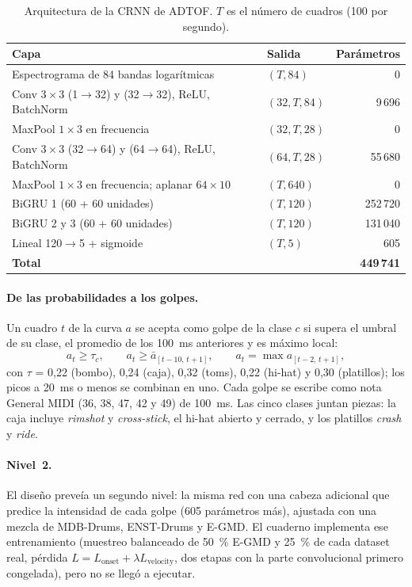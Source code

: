 \documentclass[11pt,a4paper]{article}
\begin{document}
\begin{table}[ht]
\centering
\caption{Arquitectura de la CRNN de ADTOF. $T$ es el número de cuadros (100 por segundo).}
\label{tab:arq}
\begin{tabular}{llr}
\toprule
\textbf{Capa} & \textbf{Salida} & \textbf{Parámetros} \\
\midrule
Espectrograma de 84 bandas logarítmicas & $(T, 84)$ & 0 \\
Conv $3{\times}3$ (1$\to$32) y (32$\to$32), ReLU, BatchNorm & $(32, T, 84)$ & 9\,696 \\
MaxPool $1{\times}3$ en frecuencia & $(32, T, 28)$ & 0 \\
Conv $3{\times}3$ (32$\to$64) y (64$\to$64), ReLU, BatchNorm & $(64, T, 28)$ & 55\,680 \\
MaxPool $1{\times}3$ en frecuencia; aplanar $64\times10$ & $(T, 640)$ & 0 \\
BiGRU 1 (60 + 60 unidades) & $(T, 120)$ & 252\,720 \\
BiGRU 2 y 3 (60 + 60 unidades) & $(T, 120)$ & 131\,040 \\
Lineal 120$\to$5 + sigmoide & $(T, 5)$ & 605 \\
\midrule
\textbf{Total} & & \textbf{449\,741} \\
\bottomrule
\end{tabular}
\end{table}

\paragraph{De las probabilidades a los golpes.} Un cuadro $t$ de la curva $a$ se acepta como golpe de la
clase $c$ si supera el umbral de su clase, el promedio de los 100~ms anteriores y es máximo local:
\begin{equation}
a_t \ge \tau_c,\qquad a_t \ge \bar a_{[t-10,\,t+1]},\qquad a_t = \max a_{[t-2,\,t+1]},
\end{equation}
con $\tau$ = 0{,}22 (bombo), 0{,}24 (caja), 0{,}32 (toms), 0{,}22 (hi-hat) y 0{,}30 (platillos); los picos a
20~ms o menos se combinan en uno. Cada golpe se escribe como nota General MIDI (36, 38, 47, 42 y 49) de
100~ms. Las cinco clases juntan piezas: la caja incluye \emph{rimshot} y \emph{cross-stick}, el hi-hat
abierto y cerrado, y los platillos \emph{crash} y \emph{ride}.

\paragraph{Nivel~2.} El diseño preveía un segundo nivel: la misma red con una cabeza adicional que
predice la intensidad de cada golpe (605 parámetros más), ajustada con una mezcla de MDB-Drums, ENST-Drums
y E-GMD. El cuaderno implementa ese entrenamiento (muestreo balanceado de 50~\% E-GMD y 25~\% de cada
dataset real, pérdida $L = L_{\text{onset}} + \lambda L_{\text{velocity}}$, dos etapas con la parte
convolucional primero congelada), pero no se llegó a ejecutar.
\end{document}
